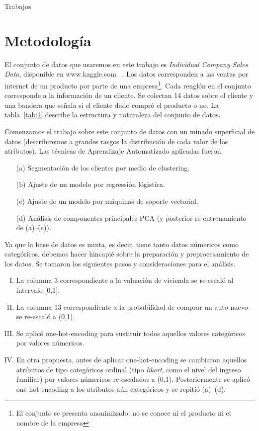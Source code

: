 \documentclass[letterpaper,11pt]{article}
\begin{document}
\begin{multicols}{2}
Trabajos
\section{Metodología}

El conjunto de datos que usaremos en este trabajo es \emph{Individual Company Sales Data}, disponible en www.kaggle.com~
\cite{kaggle}. Los datos corresponden a las ventas por internet de un producto por parte de una 
empresa\footnote{El conjunto se presenta anonimizado, no se conoce ni el producto ni el nombre de la empresa}. Cada
renglón en el conjunto corresponde a la información de un cliente.  Se colectan 14 datos sobre el cliente y una bandera
que señala si el cliente dado compró el producto o no. La tabla~\ref{tab:1} describe la estructura y naturaleza del conjunto de datos.


Comenzamos el trabajo sobre este conjunto de datos con un minado superficial de datos (describiremos a grandes rasgos
la distribución de cada valor de los atributos). Las técnicas de Aprendizaje Automatizado aplicadas fueron: 

\begin{itemize}
    \item[(a)] Segmentación de los clientes por medio de clustering.
    \item[(b)]  Ajuste de un modelo por regressión lógistica. 
    \item[(c)] Ajuste de un modelo por máquinas de soporte vectorial.
    \item[(d)] Análisis de componentes principales PCA (y posterior re-entrenamiento de (a)--(c)). 
\end{itemize}
Ya que la base de datos es mixta, es decir, tiene tanto datos númericos como categóricos,
debemos hacer hincapié sobre la preparación y preprocesamiento de los
datos. Se tomaron los siguientes pasos y consideraciones para el análisis. 

\begin{enumerate}[I.]
    \item La columna 3 correspondiente a la valuación de vivienda se re-escaló al intervalo [0,1]. 
    \item La columna 13 correspondiente a la probabilidad de comprar un auto nuevo se re-escaló a (0,1). 
    \item Se aplicó one-hot-encoding para sustituir todos aquellos valores categóricos por valores númericos. 
    \item En otra propuesta, antes de aplicar one-hot-encoding se cambiaron aquellos atributos de tipo categóricos
        ordinal (tipo \emph{likert}, como el nivel del ingreso familiar) por valores númericos re-escalados a (0,1).
        Posteriormente se aplicó one-hot-encoding a los atributos aún categóricos y se repitió (a)--(d).
\end{enumerate}
\end{multicols}
\end{document}
